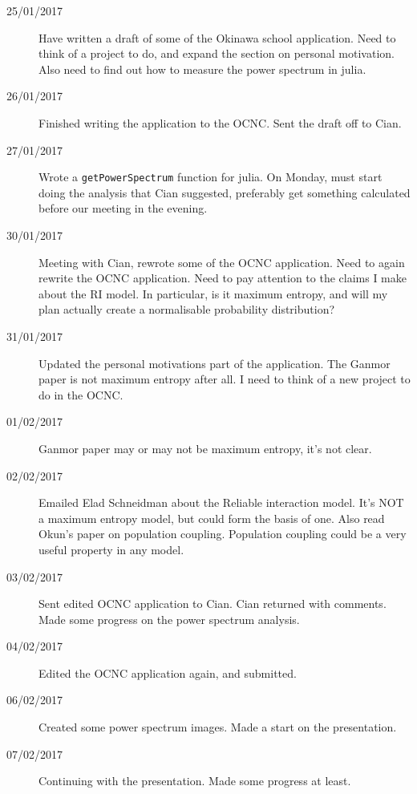 \documentclass[a4paper,12pt]{article}
\theoremstyle{definition}
\begin{document}
\begin{description}
	\item[25/01/2017] Have written a draft of some of the Okinawa school application. Need to think of a project to do, and expand the section on personal motivation. Also need to find out how to measure the power spectrum in julia.

	\item[26/01/2017] Finished writing the application to the OCNC. Sent the draft off to Cian.

	\item[27/01/2017] Wrote a \texttt{getPowerSpectrum} function for julia. On Monday, must start doing the analysis that Cian suggested, preferably get something calculated before our meeting in the evening.

	\item[30/01/2017] Meeting with Cian, rewrote some of the OCNC application. Need to again rewrite the OCNC application. Need to pay attention to the claims I make about the RI model. In particular, is it maximum entropy, and will my plan actually create a normalisable probability distribution?

	\item[31/01/2017] Updated the personal motivations part of the application. The Ganmor paper is not maximum entropy after all. I need to think of a new project to do in the OCNC.

	\item[01/02/2017] Ganmor paper may or may not be maximum entropy, it's not clear.

	\item[02/02/2017] Emailed Elad Schneidman about the Reliable interaction model. It's NOT a maximum entropy model, but could form the basis of one. Also read Okun's paper on population coupling. Population coupling could be a very useful property in any model.

	\item[03/02/2017] Sent edited OCNC application to Cian. Cian returned with comments. Made some progress on the power spectrum analysis.

	\item[04/02/2017] Edited the OCNC application again, and submitted.

	\item[06/02/2017] Created some power spectrum images. Made a start on the presentation.

	\item[07/02/2017] Continuing with the presentation. Made some progress at least.


\end{description}
\end{document}
